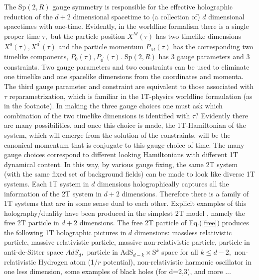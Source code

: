 \documentclass[a4paper,12pt]{article}
\begin{document}
The Sp$\left( 2,R\right) $ gauge symmetry is responsible for the
effective holographic reduction of the $d+2$ dimensional spacetime
to (a collection of) $d$ dimensional spacetimes with one-time.
Evidently, in the worldline formalism there is a single proper
time $\tau ,$ but the particle position $ X^{M}\left( \tau \right)
$ has two timelike dimensions $X^{0}\left( \tau \right)
,X^{0^{\prime }}\left( \tau \right) $ and the particle momentum $
P_{M}\left( \tau \right) $ has the corresponding two timelike
components, $ P_{0}\left( \tau \right) ,P_{0^{\prime }}\left( \tau
\right) $. Sp$\left( 2,R\right) $ has 3 gauge parameters and 3
constraints. Two gauge parameters and two constraints can be used
to eliminate one timelike and one spacelike dimensions from the
coordinates and momenta. The third gauge parameter and constraint
are equivalent to those associated with $\tau $ reparametrization,
which is familiar in the 1T-physics worldline formulation (as in
the footnote). In making the three gauge choices one must ask
which combination of the two timelike dimensions is identified
with $\tau ?$ Evidently there are many possibilities, and once
this choice is made, the 1T-Hamiltonian of the system, which will
emerge from the solution of the constraints, will be the canonical
momentum that is conjugate to this gauge choice of time. The many
gauge choices correspond to different looking Hamiltonians with
different 1T dynamical content. In this way, by various gauge
fixing, the same 2T system (with the same fixed set of background
fields) can be made to look like diverse 1T systems. Each 1T
system in $d$ dimensions holographically captures all the
information of the 2T system in $ d+2$ dimensions. Therefore there
is a family of 1T systems that are in some sense dual to each
other. Explicit examples of this holography/duality have been
produced in the simplest 2T model \cite{old2T}, namely the free 2T
particle in $d+2$ dimensions. The free 2T particle of
Eq.(\ref{free}) produces the following 1T holographic pictures in
$d$ dimensions: massless relativistic particle, massive
relativistic particle, massive non-relativistic particle, particle
in anti-de-Sitter space $AdS_{d},$ particle in AdS$_{d-k}\times
$S$^{k}$ space for all $k\leq d-2,$ non-relativistic Hydrogen atom
(1/$r$ potential), non-relativistic harmonic oscillator in one
less dimension, some examples of black holes (for d=2,3), and more
...
\end{document}
